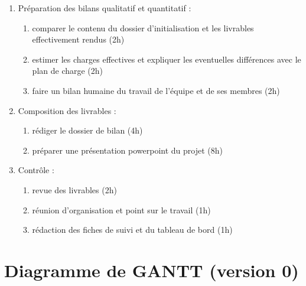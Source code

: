 \begin{enumerate}
          \begin{enumerate}
            \item Préparation des bilans qualitatif et quantitatif :
                \begin{enumerate}
                  \item comparer le contenu du dossier d'initialisation et les livrables effectivement rendus (2h)
                  \item estimer les charges effectives et expliquer les eventuelles différences avec le plan de charge (2h)
                  \item faire un bilan humaine du travail de l'équipe et de ses membres (2h)
                \end{enumerate}
            \item Composition des livrables :
                \begin{enumerate}
                  \item rédiger le dossier de bilan (4h)
                  \item préparer une présentation powerpoint du projet (8h)
                \end{enumerate}
            \item Contrôle :
              \begin{enumerate}
                \item revue des livrables (2h)
                \item réunion d'organisation et point sur le travail (1h) 
                \item rédaction des fiches de suivi et du tableau de bord (1h)
              \end{enumerate}
          \end{enumerate}

\end{enumerate}

\section{Diagramme de GANTT (version 0)}

